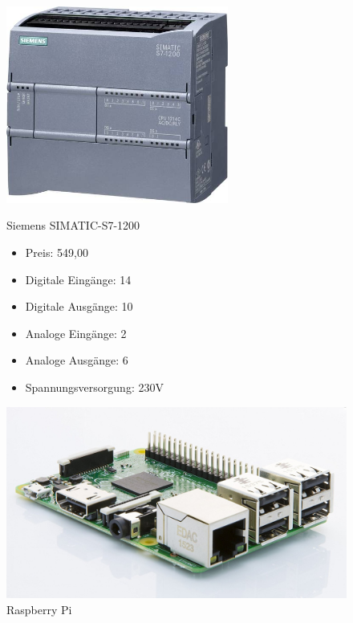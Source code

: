 \begin{figure}[H]
\begin{minipage}[t]{0.45\textwidth}
\begin{center}
\includegraphics[width=0.65\textwidth]{fig/S7}
\end{center}
\caption{Siemens SIMATIC-S7-1200}

\begin{itemize}
	\item{Preis: 549,00\textsf{\texteuro}} %
	\item{Digitale Eingänge: 14}
	\item{Digitale Ausgänge: 10}
	\item{Analoge Eingänge: 2}
	\item{Analoge Ausgänge: 6}
	\item{Spannungsversorgung: 230V}
\end{itemize}

\end{minipage}
\hspace{0.1\textwidth}
\begin{minipage}[t]{0.45\textwidth}

\includegraphics[width=\textwidth]{fig/RPI}
\caption{Raspberry Pi}



\end{minipage}
\end{figure}
